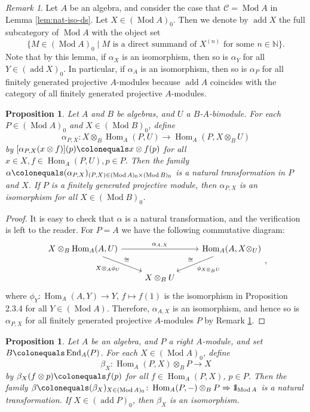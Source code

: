 \documentclass{surv-l}
\numberwithin{equation}{chapter}
\numberwithin{figure}{chapter}
\theoremstyle{plain}
\newtheorem{prp}[thm]{Proposition}
\theoremstyle{definition}
\theoremstyle{remark}
\newtheorem{rmk}[thm]{Remark}
\newcommand{\id}{1\kern-.25em{\text{{\rm l}}}}
\newcommand{\Ar}[3]{\ar[from={#1}, to={#2}, #3]}
\DeclareMathOperator{\Hom}{Hom}
\DeclareMathOperator{\End}{End}
\DeclareMathOperator{\Mod}{Mod}
\DeclareMathOperator{\add}{add}
\DeclareMathOperator{\blank}{-}
\begin{document}
\begin{rmk}
\label{rmk:iso-additive-hull}
Let $A$ be an algebra, and consider the case that ${\mathcal{C}} = \Mod A$ in Lemma \ref{lem:nat-iso-ds}.
Let $X \in (\Mod A)_0$.
Then we denote by $\add X$ the full subcategory of $\Mod A$ with the object set
\[
\{M \in (\Mod A)_0 \mid \text{$M$ is a direct summand of $X^{(n)}$ for some $n \in \mathbb{N}$}\}.
\]
Note that by this lemma, if $\alpha_X$ is an isomorphism, then so is $\alpha_Y$ for all $Y \in (\add X)_0$.
In particular, if $\alpha_A$ is an isomorphism, then so is $\alpha_P$ for all finitely generated projective $A$-modules
because $\add A$ coincides with the category of all finitely generated projective $A$-modules.
\end{rmk}

\begin{prp}
\label{prp:Hom-fgp-tensor}
Let $A$ and $B$ be algebras, and $U$ a $B$-$A$-bimodule.
For  each $P \in (\Mod A)_0$ and $X \in (\Mod B)_0$, define
\[
\alpha_{P,X} \colon X \otimes_B \Hom_A(P, U) \to \Hom_A(P, X \otimes_B U)
\]
by $[\alpha_{P,X}(x \otimes f)](p)\colonequals  x \otimes f(p)$ for all $x \in X, f\in \Hom_A(P, U), p \in P$.
Then the family $\alpha\colonequals  (\alpha_{P,X})_{(P,X) \in (\Mod A)_0 \times (\Mod B)_0}$
is a natural transformation in $P$ and $X$.
If $P$ is a finitely generated projective module, then $\alpha_{P,X}$ is an isomorphism for all $X \in (\Mod B)_0$.
\end{prp}

\begin{proof}
It is easy to check that $\alpha$ is a natural transformation, and the verification is left to the reader.
For $P = A$ we have the following commutative diagram:
\[
\begin{tikzcd}
X \otimes_B\Hom_A(A, U) && \Hom_A(A, X \otimes_U)\\
& X \otimes_B U
\Ar{1-1}{1-3}{"\alpha_{A,X}"}
\Ar{1-1}{2-2}{"X \otimes_A \phi_U"', "\cong"}
\Ar{1-3}{2-2}{"\phi_{X\otimes_B U}", "\cong"'}
\end{tikzcd},
\]
where $\phi_Y \colon \Hom_A(A, Y) \to Y$, $f \mapsto f(1)$ is the isomorphism in Proposition 2.3.4
for all $Y \in (\Mod A)$.
Therefore, $\alpha_{A, X}$ is an isomorphism, and hence
so is $\alpha_{P,X}$ for all finitely generated projective $A$-modules $P$
by Remark \ref{rmk:iso-additive-hull}.
\end{proof}

\begin{prp}
\label{prp:trace-iso}
Let $A$ be an algebra, and $P$ a right $A$-module, and set $B\colonequals  \End_A(P)$.
For each $X \in (\Mod A)_0$, define
\[
\beta_X \colon \Hom_A(P, X) \otimes_B P \to X
\]
by $\beta_X(f\otimes p)\colonequals  f(p)$ for all $f \in \Hom_A(P, X)$, $p \in P$.
Then the family $\beta\colonequals  (\beta_{X})_{X \in (\Mod A)_0} \colon \Hom_A(P,\blank) \otimes_B P \Rightarrow \id_{\Mod A}$
is a natural transformation.
If $X \in (\add P)_0$, then $\beta_X$ is an isomorphism.
\end{prp}
\end{document}
